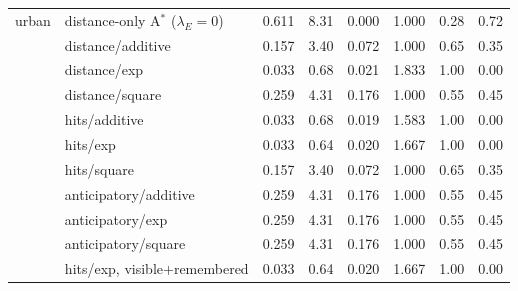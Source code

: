 \begin{tabular}{llcccccc}
urban & distance-only A$^*$ ($\lambda_E=0$) & 0.611 & 8.31 & 0.000 & 1.000 & 0.28 & 0.72 \\
 & distance/additive & 0.157 & 3.40 & 0.072 & 1.000 & 0.65 & 0.35 \\
 & distance/exp & 0.033 & 0.68 & 0.021 & 1.833 & 1.00 & 0.00 \\
 & distance/square & 0.259 & 4.31 & 0.176 & 1.000 & 0.55 & 0.45 \\
 & hits/additive & 0.033 & 0.68 & 0.019 & 1.583 & 1.00 & 0.00 \\
 & hits/exp & 0.033 & 0.64 & 0.020 & 1.667 & 1.00 & 0.00 \\
 & hits/square & 0.157 & 3.40 & 0.072 & 1.000 & 0.65 & 0.35 \\
 & anticipatory/additive & 0.259 & 4.31 & 0.176 & 1.000 & 0.55 & 0.45 \\
 & anticipatory/exp & 0.259 & 4.31 & 0.176 & 1.000 & 0.55 & 0.45 \\
 & anticipatory/square & 0.259 & 4.31 & 0.176 & 1.000 & 0.55 & 0.45 \\
 & hits/exp, visible+remembered & 0.033 & 0.64 & 0.020 & 1.667 & 1.00 & 0.00 \\
\bottomrule
\end{tabular}
